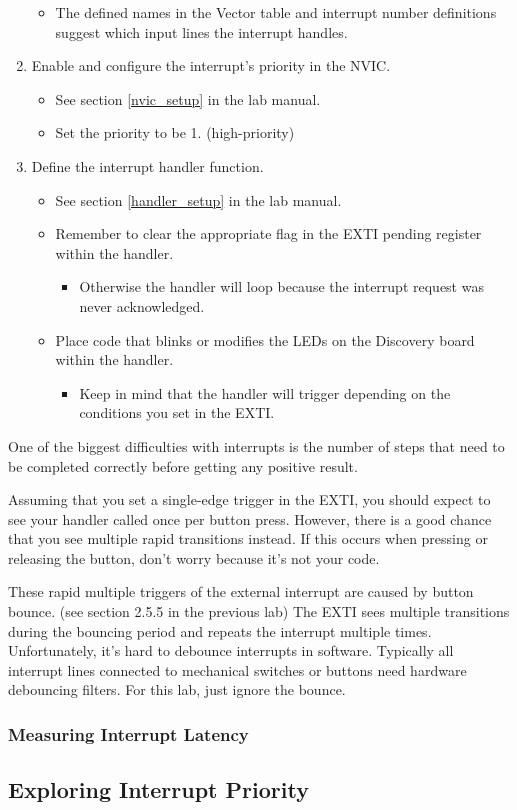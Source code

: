\documentclass[11pt,fleqn]{book} %
\begin{document}
\begin{enumerate}
\begin{itemize}
        \item  The defined names in the Vector table and interrupt number definitions suggest which input lines the interrupt handles.
    \end{itemize}
    \item Enable and configure the interrupt's priority in the NVIC.
    \begin{itemize}
        \item See section \ref{nvic_setup} in the lab manual.
        \item Set the priority to be 1. (high-priority)
    \end{itemize}
    \item Define the interrupt handler function.
    \begin{itemize}
        \item See section \ref{handler_setup} in the lab manual.
        \item Remember to clear the appropriate flag in the EXTI pending register within the handler.
        \begin{itemize}
            \item  Otherwise the handler will loop because the interrupt request was never acknowledged.
        \end{itemize}
        \item Place code that blinks or modifies the LEDs on the Discovery board within the handler.
        \begin{itemize}
            \item Keep in mind that the handler will trigger depending on the conditions you set in the EXTI. 
        \end{itemize}
    \end{itemize}
\end{enumerate}

One of the biggest difficulties with interrupts is the number of steps that need to be completed correctly before getting any positive result. 

Assuming that you set a single-edge trigger in the EXTI, you should expect to see your handler called once per button press. However, there is a good chance that you see multiple rapid transitions instead. If this occurs when pressing or releasing the button, don't worry because it's not your code.

These rapid multiple triggers of the external interrupt are caused by button bounce. (see section 2.5.5 in the previous lab) The EXTI sees multiple transitions during the bouncing period and repeats the interrupt multiple times. Unfortunately, it's hard to debounce interrupts in software. Typically all interrupt lines connected to mechanical switches or buttons need hardware debouncing filters. For this lab, just ignore the bounce.

\subsubsection{Measuring Interrupt Latency}

\subsection{Exploring Interrupt Priority}
\end{document}
